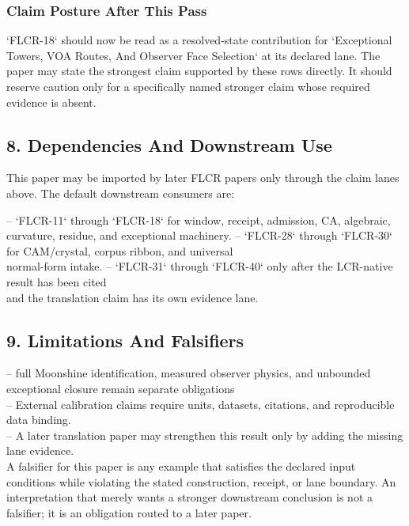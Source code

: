 \documentclass[11pt]{article}
\begin{document}
\subsubsection*{Claim Posture After This Pass}

`FLCR-18` should now be read as a resolved-state contribution for `Exceptional Towers, VOA Routes, And Observer Face Selection` at its declared lane. The paper may state the strongest claim supported by these rows directly. It should reserve caution only for a specifically named stronger claim whose required evidence is absent.

\subsection*{8. Dependencies And Downstream Use}

This paper may be imported by later FLCR papers only through the claim lanes
above. The default downstream consumers are:

\noindent{}-- `FLCR-11` through `FLCR-18` for window, receipt, admission, CA, algebraic,\\
  curvature, residue, and exceptional machinery.
\noindent{}-- `FLCR-28` through `FLCR-30` for CAM/crystal, corpus ribbon, and universal\\
  normal-form intake.
\noindent{}-- `FLCR-31` through `FLCR-40` only after the LCR-native result has been cited\\
  and the translation claim has its own evidence lane.

\subsection*{9. Limitations And Falsifiers}

\noindent{}-- full Moonshine identification, measured observer physics, and unbounded exceptional closure remain separate obligations\\
\noindent{}-- External calibration claims require units, datasets, citations, and reproducible data binding.\\
\noindent{}-- A later translation paper may strengthen this result only by adding the missing lane evidence.\\

A falsifier for this paper is any example that satisfies the declared input
conditions while violating the stated construction, receipt, or lane boundary.
An interpretation that merely wants a stronger downstream conclusion is not a
falsifier; it is an obligation routed to a later paper.
\end{document}

